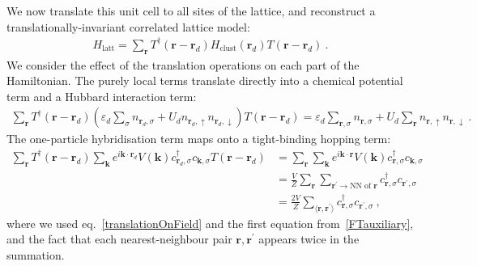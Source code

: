 We now translate this unit cell to all sites of the lattice, and reconstruct a translationally-invariant correlated lattice model:
\begin{equation}\begin{aligned}\label{tilingPrescription}
	{H}_\text{latt} = \sum_{{\bm r}}T^\dagger({\bm r} - {\bm r}_d)H_\text{clust}(\bm r_d)T({\bm r} - {\bm r}_d)~.
\end{aligned}\end{equation}
We consider the effect of the translation operations on each part of the Hamiltonian. The purely local terms translate directly into a chemical potential term and a Hubbard interaction term:
\begin{equation}\begin{aligned}
	\sum_{{\bm r}}T^\dagger({\bm r} - {\bm r}_d) (\varepsilon_d \sum_\sigma n_{\bm r_d,\sigma} + U_d n_{{\bm r_d}, \uparrow} n_{{\bm r_d}, \downarrow})T({\bm r} - {\bm r}_d) = \varepsilon_d \sum_{\bm r, \sigma} n_{\bm r,\sigma} + U_d \sum_{\bm r}n_{{\bm r}, \uparrow} n_{{\bm r}, \downarrow}~.
\end{aligned}\end{equation}
The one-particle hybridisation term maps onto a tight-binding hopping term:
\begin{equation}\begin{aligned}
	\sum_{{\bm r}}T^\dagger({\bm r} - {\bm r}_d) \sum_{\bm k} e^{i \bm k \cdot \bm r_d }V(\bm k)c^\dagger_{{\bm r}_d,\sigma} c_{{\bm k},\sigma}T({\bm r} - {\bm r}_d) &= \sum_{{\bm r}}\sum_{\bm k} e^{i \bm k \cdot \bm r} V(\bm k) c^\dagger_{{\bm r},\sigma} c_{{\bm k},\sigma}\\
																																									  &= \frac{V}{Z}\sum_{\bm r}\sum_{\bm r^\prime \to \text{NN of~}\bm r}  c^\dagger_{{\bm r},\sigma} c_{{\bm r}^\prime,\sigma}\\
																																									  &= \frac{2V}{Z}\sum_{\langle \bm r,\bm r^\prime \rangle}  c^\dagger_{{\bm r},\sigma} c_{{\bm r}^\prime,\sigma}~,
\end{aligned}\end{equation}
where we used eq.~\ref{translationOnField} and the first equation from~\ref{FTauxiliary}, and the fact that each nearest-neighbour pair \(\bm r, \bm r^\prime\) appears twice in the summation.

